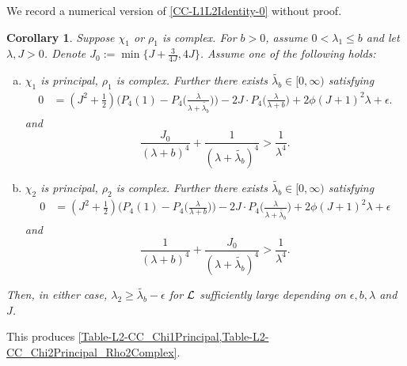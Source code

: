 \documentclass[12pt,psamsfonts]{amsart}
\newtheorem{cor}[thm]{Corollary}
\theoremstyle{definition}
\theoremstyle{remark}
\numberwithin{equation}{section}
\begin{document}
We record a numerical version of \cref{CC-L1L2Identity-0} without proof. 
\begin{cor} \label{CC-L1L2-Principmedium-Numerical} Suppose $\chi_1$ or $\rho_1$ is complex. For $b > 0$, assume $0 < \lambda_1 \leq b$ and let $\lambda, J > 0$. Denote $J_0 := \min\{ J + \tfrac{3}{4J}, 4J \}$. Assume one of the following holds: 

\begin{enumerate}[(a)]
	\item  $\chi_1$ is principal, $\rho_1$ is complex. Further there exists $\tilde{\lambda_b}\in [0,\infty)$ satisfying
\begin{align*}
0 & = (J^2 + \tfrac{1}{2}) \big( P_4(1) - P_4\big( \frac{\lambda}{\lambda+ \tilde{\lambda_b} } \big) \big) - 2J \cdot P_4\big( \frac{\lambda}{\lambda+b} \big)  + 2\phi (J+1)^2 \lambda + \epsilon.
\end{align*}
and
\[
\frac{J_0}{(\lambda+b)^4} + \frac{1}{(\lambda+\tilde{\lambda_b})^4} > \frac{1}{ \lambda^4}.
\]
	\item $\chi_2$ is principal, $\rho_2$ is complex. Further there exists $\tilde{\lambda_b}\in [0,\infty)$ satisfying
	\begin{align*}
0 & = (J^2 + \tfrac{1}{2}) \big( P_4(1) - P_4\big( \frac{\lambda}{\lambda+ b} \big) \big) - 2J \cdot P_4\big( \frac{\lambda}{\lambda+\tilde{\lambda_b}} \big)  + 2\phi (J+1)^2 \lambda + \epsilon
\end{align*}
and
\[
 \frac{1}{(\lambda+b)^4} + \frac{J_0}{(\lambda+\tilde{\lambda_b})^4} > \frac{1}{ \lambda^4}.
\]
\end{enumerate}
Then, in either case, $\lambda_2 \geq \tilde{\lambda_b} - \epsilon$ for $\mathcal{L}$ sufficiently large depending on $\epsilon, b, \lambda$ and $J$. 
\end{cor}

This produces \cref{Table-L2-CC_Chi1Principal,Table-L2-CC_Chi2Principal_Rho2Complex}. 
\end{document}
